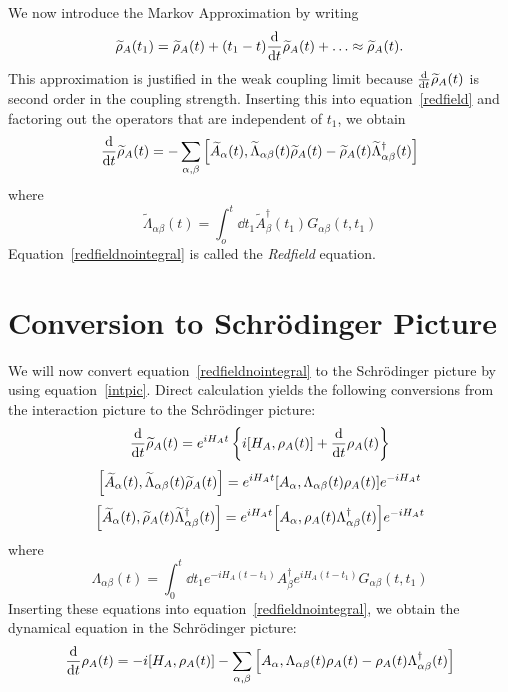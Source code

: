 \documentclass{article}
\newcommand{\til}[1]{\widetilde{#1}}
\begin{document}
We now introduce the Markov Approximation by writing
\begin{equation}\label{markov}
\til{\rho}_A(t_1) = \til{\rho}_A(t) + (t_1-t)\dv{t}\til{\rho}_A(t)+\ldots \approx \til{\rho}_A(t).
\end{equation}
This approximation is justified in the weak coupling limit because $\dv{t}\til{\rho}_A(t)$ is second order in the coupling strength. Inserting this into equation~\ref{redfield} and factoring out the operators that are independent of $t_1$, we obtain
\begin{equation}\label{redfieldnointegral}
\dv{t}\til{\rho}_A(t) = -\sum_{\alpha,\beta}\comm{\til{A}_{\alpha}(t)}{\til{\Lambda}_{\alpha\beta}(t)\til{\rho}_A(t) - \til{\rho}_A(t)\til{\Lambda}_{\alpha\beta}^{\dag}(t)}
\end{equation}
where
\begin{equation}\label{Lambdaint}
\til{\Lambda}_{\alpha\beta}(t) = \int_o^t\dd{t_1} \til{A}_{\beta}^{\dag}(t_1)G_{\alpha\beta}(t,t_1)
\end{equation}
Equation~\ref{redfieldnointegral} is called the \textit{Redfield} equation.

\section{Conversion to Schr{\"o}dinger Picture}

We will now convert equation~\ref{redfieldnointegral} to the Schr{\"o}dinger picture by using equation~\ref{intpic}. Direct calculation yields the following conversions from the interaction picture to the Schr{\"o}dinger picture:
\begin{equation}\label{p1}
\dv{t}\til{\rho}_A(t) = e^{iH_At}\left\{i\comm{H_A}{\rho_A(t)}+\dv{t}\rho_A(t)\right\}
\end{equation}
\begin{equation}\label{p2}
\comm{\til{A}_{\alpha}(t)}{\til{\Lambda}_{\alpha\beta}(t)\til{\rho}_A(t)} = e^{iH_At}\comm{A_{\alpha}}{\Lambda_{\alpha\beta}(t)\rho_A(t)}e^{-iH_At}
\end{equation}
\begin{equation}\label{p3}
\comm{\til{A}_{\alpha}(t)}{\til{\rho}_A(t)\til{\Lambda}_{\alpha\beta}^{\dag}(t)} = e^{iH_At}\comm{A_{\alpha}}{\rho_A(t)\Lambda_{\alpha\beta}^{\dag}(t)}e^{-iH_At}
\end{equation}
where
\begin{equation}\label{Lambdasch}
\Lambda_{\alpha\beta}(t) = \int_0^t\dd{t_1} e^{-iH_A(t-t_1)}A_{\beta}^{\dag}e^{iH_A(t-t_1)}G_{\alpha\beta}(t,t_1)
\end{equation}
Inserting these equations into equation~\ref{redfieldnointegral}, we obtain the dynamical equation in the Schr{\"o}dinger picture:
\begin{equation}\label{yas}
\dv{t}\rho_A(t) = -i\comm{H_A}{\rho_A(t)}-\sum_{\alpha,\beta}\comm{A_{\alpha}}{\Lambda_{\alpha\beta}(t)\rho_A(t)-\rho_A(t)\Lambda_{\alpha\beta}^{\dag}(t)}
\end{equation}
\end{document}
